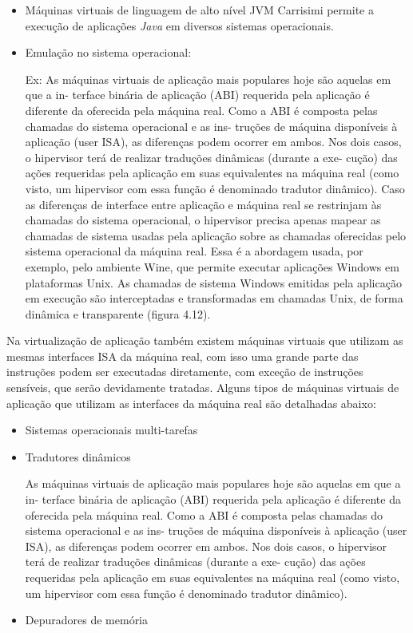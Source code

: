 \begin{itemize}
 \item Máquinas virtuais de linguagem de alto nível
JVM Carrisimi
permite a execução de aplicações \textit{Java} em diversos sistemas operacionais.

 \item Emulação no sistema operacional: 
 
Ex:
As máquinas virtuais de aplicação mais populares hoje são aquelas em que a in-
terface binária de aplicação (ABI) requerida pela aplicação é diferente da oferecida pela
máquina real. Como a ABI é composta pelas chamadas do sistema operacional e as ins-
truções de máquina disponíveis à aplicação (user ISA), as diferenças podem ocorrer em
ambos. Nos dois casos, o hipervisor terá de realizar traduções dinâmicas (durante a exe-
cução) das ações requeridas pela aplicação em suas equivalentes na máquina real (como
visto, um hipervisor com essa função é denominado tradutor dinâmico).
Caso as diferenças de interface entre aplicação e máquina real se restrinjam às
chamadas do sistema operacional, o hipervisor precisa apenas mapear as chamadas de
sistema usadas pela aplicação sobre as chamadas oferecidas pelo sistema operacional da
máquina real. Essa é a abordagem usada, por exemplo, pelo ambiente Wine, que permite
executar aplicações Windows em plataformas Unix. As chamadas de sistema Windows
emitidas pela aplicação em execução são interceptadas e transformadas em chamadas
Unix, de forma dinâmica e transparente (figura 4.12).
\end{itemize}

Na virtualização de aplicação também existem máquinas virtuais que utilizam as mesmas interfaces \ac{ISA} da máquina real,
com isso uma grande parte das instruções podem ser executadas diretamente, com exceção de instruções sensíveis, que serão devidamente
tratadas. Alguns tipos de máquinas virtuais de aplicação que utilizam as interfaces da máquina real são detalhadas abaixo:

\begin{itemize}
 \item Sistemas operacionais multi-tarefas
 
 \item Tradutores dinâmicos
 
As máquinas virtuais de aplicação mais populares hoje são aquelas em que a in-
terface binária de aplicação (ABI) requerida pela aplicação é diferente da oferecida pela
máquina real. Como a ABI é composta pelas chamadas do sistema operacional e as ins-
truções de máquina disponíveis à aplicação (user ISA), as diferenças podem ocorrer em
ambos. Nos dois casos, o hipervisor terá de realizar traduções dinâmicas (durante a exe-
cução) das ações requeridas pela aplicação em suas equivalentes na máquina real (como
visto, um hipervisor com essa função é denominado tradutor dinâmico).

 \item Depuradores de memória
 
\end{itemize}


